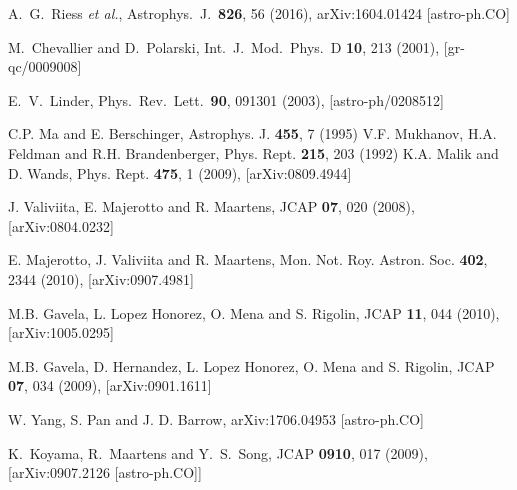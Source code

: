 \documentclass[superscriptaddress,oneolumn,secnumarabic,
amssymb,amsmath,nobibnotes,aps,prd,showpacs,nofootinbib]{revtex4}%
\begin{document}
\begin{thebibliography}{*}
A.~G.~Riess {\it et al.},
Astrophys.\ J.\  {\bf 826}, 56 (2016),
arXiv:1604.01424 [astro-ph.CO]

  M.~Chevallier and D.~Polarski,
  Int.\ J.\ Mod.\ Phys.\ D {\bf 10}, 213 (2001),
  [gr-qc/0009008]



  E.~V.~Linder,
  Phys.\ Rev.\ Lett.\  {\bf 90}, 091301 (2003),
  [astro-ph/0208512]


 C.P. Ma and E. Berschinger, Astrophys. J. \textbf{455}, 7 (1995)
 V.F. Mukhanov, H.A. Feldman and R.H. Brandenberger, Phys. Rept. \textbf{215}, 203 (1992)
 K.A. Malik and D. Wands, Phys. Rept. \textbf{475}, 1 (2009), [arXiv:0809.4944]

 J. Valiviita, E. Majerotto and R. Maartens, JCAP \textbf{07}, 020 (2008), [arXiv:0804.0232]

 E. Majerotto, J. Valiviita and R. Maartens, Mon. Not. Roy. Astron. Soc. \textbf{402}, 2344 (2010), [arXiv:0907.4981]



 M.B. Gavela, L. Lopez Honorez, O. Mena and S. Rigolin, JCAP \textbf{11}, 044 (2010), [arXiv:1005.0295]

 M.B. Gavela, D. Hernandez, L. Lopez Honorez, O. Mena and S. Rigolin, JCAP \textbf{07}, 034 (2009), [arXiv:0901.1611]





 W. Yang, S. Pan and J. D. Barrow, arXiv:1706.04953 [astro-ph.CO]

  K.~Koyama, R.~Maartens and Y.~S.~Song,
  JCAP {\bf 0910}, 017 (2009),
  [arXiv:0907.2126 [astro-ph.CO]]



\end{thebibliography}
\end{document}
